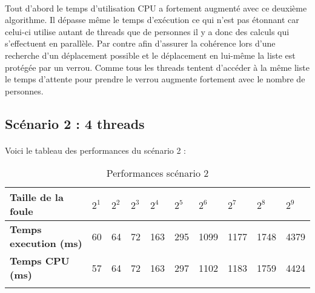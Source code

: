 \documentclass[12pt,oneside,a4paper]{article}
\begin{document}
\paragraph{}
Tout d'abord le temps d'utilisation CPU a fortement augmenté avec ce deuxième algorithme. Il dépasse même
le temps d'exécution ce qui n'est pas étonnant car celui-ci utilise autant de threads que de personnes il
y a donc des calculs qui s'effectuent en parallèle. Par contre afin d'assurer la cohérence lors d'une recherche
d'un déplacement possible et le déplacement en lui-même la liste est protégée par un verrou. Comme tous les
threads tentent d'accéder à la même liste le temps d'attente pour prendre le verrou augmente fortement avec le nombre de personnes.

\subsection{Scénario 2 : 4 threads}
\paragraph{}
Voici le tableau des performances du scénario 2 :

\begin{table}[h]
  \centering
  \small
  \begin{tabular}{llllllllll}
  \hline
  \multicolumn{1}{|l|}{\textbf{Taille de la foule}}                     & \multicolumn{1}{l|}{$2^1$} & \multicolumn{1}{l|}{$2^2$} & \multicolumn{1}{l|}{$2^3$} & \multicolumn{1}{l|}{$2^4$} & \multicolumn{1}{l|}{$2^5$} & \multicolumn{1}{l|}{$2^6$} & \multicolumn{1}{l|}{$2^7$} & \multicolumn{1}{l|}{$2^8$} & \multicolumn{1}{l|}{$2^9$} \\ \hline
  \multicolumn{1}{|l|}{\textbf{Temps execution (ms)}} & \multicolumn{1}{l|}{60}  & \multicolumn{1}{l|}{64}  & \multicolumn{1}{l|}{72}  & \multicolumn{1}{l|}{163}  & \multicolumn{1}{l|}{295}  & \multicolumn{1}{l|}{1099}  & \multicolumn{1}{l|}{1177}  & \multicolumn{1}{l|}{1748}  & \multicolumn{1}{l|}{4379}  \\ \hline
  \multicolumn{1}{|l|}{\textbf{Temps CPU (ms)}}    & \multicolumn{1}{l|}{57}  & \multicolumn{1}{l|}{64}  & \multicolumn{1}{l|}{72}  & \multicolumn{1}{l|}{163}  & \multicolumn{1}{l|}{297}  & \multicolumn{1}{l|}{1102}  & \multicolumn{1}{l|}{1183}  & \multicolumn{1}{l|}{1759}  & \multicolumn{1}{l|}{4424}  \\ \hline
                                                                        &                        &                        &                        &                        &                        &                        &                        &                        &                       
  \end{tabular}
  \caption{Performances scénario 2}
  \label{Performances scénario 2}
\end{table}
\end{document}
